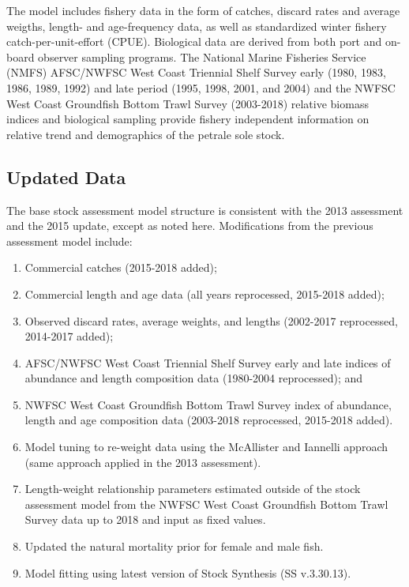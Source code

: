 \documentclass[12pt,]{article}
\begin{document}
The model includes fishery data in the form of catches, discard rates
and average weigths, length- and age-frequency data, as well as
standardized winter fishery catch-per-unit-effort (CPUE). Biological
data are derived from both port and on-board observer sampling programs.
The National Marine Fisheries Service (NMFS) AFSC/NWFSC West Coast
Triennial Shelf Survey early (1980, 1983, 1986, 1989, 1992) and late
period (1995, 1998, 2001, and 2004) and the NWFSC West Coast Groundfish
Bottom Trawl Survey (2003-2018) relative biomass indices and biological
sampling provide fishery independent information on relative trend and
demographics of the petrale sole stock.

\subsection*{Updated Data}\label{updated-data}

The base stock assessment model structure is consistent with the 2013
assessment and the 2015 update, except as noted here. Modifications from
the previous assessment model include:

\begin{enumerate}
  \item Commercial catches (2015-2018 added);
  \item Commercial length and age data (all years reprocessed, 2015-2018 added);
  \item Observed discard rates, average weights, and lengths (2002-2017 reprocessed, 2014-2017 added); 
  \item AFSC/NWFSC West Coast Triennial Shelf Survey early and late indices of abundance and length composition data (1980-2004 reprocessed); and
  \item NWFSC West Coast Groundfish Bottom Trawl Survey index of abundance, length and age composition data (2003-2018 reprocessed, 2015-2018 added).
  \item Model tuning to re-weight data using the McAllister and Iannelli approach (same approach applied in the 2013 assessment). 
  \item Length-weight relationship parameters estimated outside of the stock assessment model from the NWFSC West Coast Groundfish Bottom Trawl Survey data up to 2018 and input as fixed values.
  \item Updated the natural mortality prior for female and male fish.
  \item Model fitting using latest version of Stock Synthesis (SS v.3.30.13). 
\end{enumerate}
\end{document}
